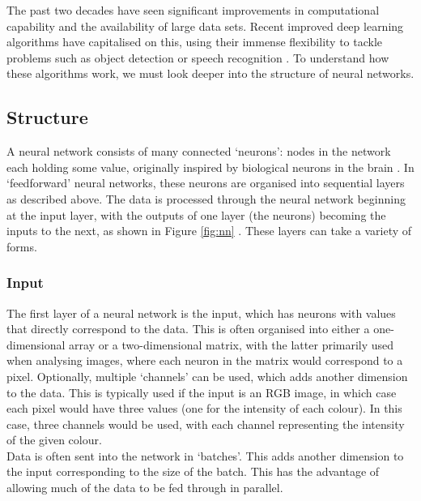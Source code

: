 \documentclass[11pt,a4paper,onecolumn]{report}
\begin{document}
The past two decades have seen significant improvements in computational
capability and the availability of large data sets. Recent improved deep
learning algorithms have capitalised on this, using their immense flexibility to
tackle problems such as object detection \citep{krizhevsky_imagenet_2017} or
speech recognition \citep{toth_phone_2015}. To understand how these algorithms
work, we must look deeper into the structure of neural networks.

%
%


\subsection{Structure}

A neural network consists of many connected `neurons': nodes in the network each
holding some value, originally inspired by biological neurons in the brain
\citep{mcculloch1943}. In `feedforward' neural networks, these neurons are
organised into sequential layers as described above. The data is processed
through the neural network beginning at the input layer, with the outputs of one
layer (the neurons) becoming the inputs to the next, as shown in Figure
\ref{fig:nn} \citep{michelucci2018}. These layers can take a variety of forms.


\subsubsection{Input}
The first layer of a neural network is the input, which has neurons with values
that directly correspond to the data. This is often organised into either a
one-dimensional array or a two-dimensional matrix, with the latter primarily
used when analysing images, where each neuron in the matrix would correspond to
a pixel. Optionally, multiple `channels' can be used, which adds another
dimension to the data. This is typically used if the input is an RGB image, in
which case each pixel would have three values (one for the intensity of each
colour). In this case, three channels would be used, with each channel
representing the intensity of the given colour.\\

Data is often sent into the network in `batches'. This adds another dimension
to the input corresponding to the size of the batch. This has the advantage of
allowing much of the data to be fed through in parallel.
\end{document}

